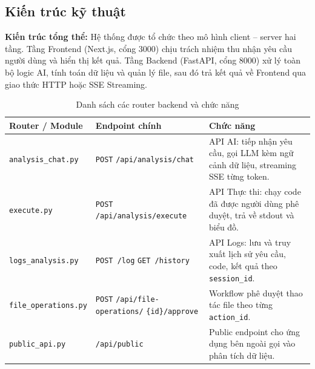 \subsection{Kiến trúc kỹ thuật}
\label{subsec:ai_architecture}

\noindent\textbf{Kiến trúc tổng thể:}
Hệ thống được tổ chức theo mô hình client -- server hai tầng. Tầng Frontend (Next.js, cổng 3000) chịu trách nhiệm thu nhận yêu cầu người dùng và hiển thị kết quả. Tầng Backend (FastAPI, cổng 8000) xử lý toàn bộ logic AI, tính toán dữ liệu và quản lý file, sau đó trả kết quả về Frontend qua giao thức HTTP hoặc SSE Streaming.

\begin{table}[H]
\centering
\small
\begin{tabularx}{\textwidth}{L{3.8cm} L{5.5cm} Y}
\textbf{Router / Module} & \textbf{Endpoint chính} & \textbf{Chức năng} \\ \hline
\texttt{analysis\_chat.py} & \texttt{POST} \newline \texttt{/api/analysis/chat} & API AI: tiếp nhận yêu cầu, gọi LLM kèm ngữ cảnh dữ liệu, streaming SSE từng token. \\
\texttt{execute.py} & \texttt{POST} \newline \texttt{/api/analysis/execute} & API Thực thi: chạy code đã được người dùng phê duyệt, trả về stdout và biểu đồ. \\
\texttt{logs\_analysis.py} & \texttt{POST /log} \newline \texttt{GET /history} & API Logs: lưu và truy xuất lịch sử yêu cầu, code, kết quả theo \texttt{session\_id}. \\
\texttt{file\_operations.py} & \texttt{POST} \newline \texttt{/api/file-operations/} \newline \texttt{\{id\}/approve} & Workflow phê duyệt thao tác file theo từng \texttt{action\_id}. \\
\texttt{public\_api.py} & \texttt{/api/public} & Public endpoint cho ứng dụng bên ngoài gọi vào phân tích dữ liệu. \\
\end{tabularx}
\caption{Danh sách các router backend và chức năng}
\label{tab:ai_routers}
\end{table}


